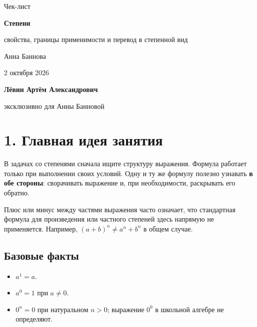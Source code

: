 \documentclass[a4paper,12pt]{article}
\newcommand{\term}[1]{\textbf{\color{darkaccent}#1}}
\newcommand{\note}[1]{\par\smallskip\noindent{\color{warn}\textbf{Проверка:}} #1\par\smallskip}
\begin{document}
\thispagestyle{empty}
\begin{center}
\vspace*{24mm}
{\Large\color{textgray}Чек-лист}\par
\vspace{5mm}
{\Huge\bfseries\color{darkaccent}Степени}\par
\vspace{3mm}
{\LARGE\color{accent}свойства, границы применимости и перевод в степенной вид}\par
\vspace{14mm}
{\large Анна Баннова}\par
\vspace{2mm}
{\normalsize 2 октября 2026}\par
\vfill
{\large\bfseries Лёвин Артём Александрович}\par
{\normalsize эксклюзивно для Анны Банновой}\par
\vspace{22mm}
\end{center}
\clearpage

\section*{1. Главная идея занятия}

В задачах со степенями сначала ищите структуру выражения. Формула работает только при выполнении своих условий. Одну и ту же формулу полезно узнавать \term{в обе стороны}: сворачивать выражение и, при необходимости, раскрывать его обратно.

\note{Плюс или минус между частями выражения часто означает, что стандартная формула для произведения или частного степеней здесь напрямую не применяется. Например, $(a+b)^n\ne a^n+b^n$ в общем случае.}

\subsection*{Базовые факты}
\begin{itemize}
  \item $a^1=a$.
  \item $a^0=1$ при $a\ne0$.
  \item $0^n=0$ при натуральном $n>0$; выражение $0^0$ в школьной алгебре не определяют.
\end{itemize}
\end{document}
